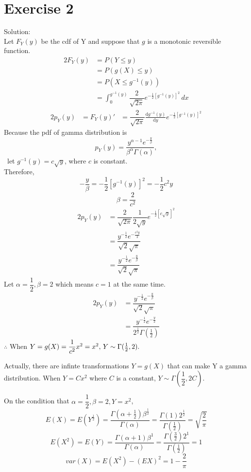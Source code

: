 \documentclass[a4papers]{ctexart}
\begin{document}
\section*{Exercise 2}
\noindent Solution:\\
\indent Let $F_Y(y)$ be the cdf of Y and suppose that $g$ is a monotonic reversible function.
\begin{alignat*}{2}
   F_Y(y) &= P(Y \le y)\\
          &= P(g(X) \le y)\\
          &= P(X \le g^{-1}(y))\\
          &= \int_{0}^{g^{-1}(y)}\dfrac{2}{\sqrt{2\pi}}e^{-\frac{1}{2}[g^{-1}(y)]^2}\,dx
\end{alignat*}
\begin{alignat*}{2}
    p_Y(y) &= F_Y(y)'
           &= \dfrac{2}{\sqrt{2\pi}}\frac{\mathrm{d}g^{-1}(y)}{\mathrm{d}y}e^{-\frac{1}{2}[g^{-1}(y)]^2}
\end{alignat*}
Because the pdf of gamma distribution is \[ p_Y(y) = \dfrac{y^{\alpha-1}e^{-\frac{y}{\beta}}}{\beta^\alpha\Gamma(\alpha)}, \]\,
let $g^{-1}(y)=c\sqrt{y}$,  where $c$ is constant.\\
Therefore, \[ -\dfrac{y}{\beta} = -\frac{1}{2}[g^{-1}(y)]^2 = -\frac{1}{2}c^2y \]
\[ \beta = \dfrac{2}{c^2} \]
\begin{alignat*}{2}
     p_Y(y)&=\dfrac{2}{\sqrt{2\pi}}\dfrac{1}{2\sqrt{y}}e^{-\frac{1}{2}[c\sqrt{y}]^2}\\
           &=\dfrac{y^{-\frac{1}{2}} e^{-\frac{c^2y}{2}}}{\sqrt{2}\sqrt{\pi}}\\
           &=\dfrac{y^{-\frac{1}{2}} e^{-\frac{y}{\beta}}}{\sqrt{2}\sqrt{\pi}}
\end{alignat*}
Let $\alpha = \dfrac{1}{2},\beta = 2$ which means $c = 1$ at the same time.\\
\begin{alignat*}{2}
     p_Y(y)&=\dfrac{y^{-\frac{1}{2}} e^{-\frac{y}{\beta}}}{\sqrt{2}\sqrt{\pi}}\\
           &=\dfrac{y^{-\frac{1}{2}} e^{-\frac{y}{2}}}{2^{\frac{1}{2}}\Gamma({\frac{1}{2}})}
\end{alignat*}
$\therefore$ When $Y=g(X)=\dfrac{1}{c^2}x^2=x^2,\, Y \sim \Gamma(\frac{1}{2},2).\\$

Actually, there are infinte transformations $Y=g(X)$ that can make Y a gamma distribution. 
When $Y=Cx^2$ where $C$ is a constant, $Y \sim \Gamma(\dfrac{1}{2},2C)$.

On the condition that $\alpha=\dfrac{1}{2},\beta=2,Y=x^2$,
\[
    E(X)=E(Y^{\frac{1}{2}})
    =\dfrac{ \Gamma(\alpha+\frac{1}{2}) \beta^{\frac{1}{2}} }{\Gamma(\alpha)} 
    =\dfrac{ \Gamma(1) 2^{\frac{1}{2}} }{\Gamma(\frac{1}{2})}=\sqrt{\dfrac{2}{\pi}}    
\]
\[
    E(X^2)=E(Y)
    =\dfrac{ \Gamma(\alpha+1) \beta^1 }{\Gamma(\alpha)} 
    =\dfrac{ \Gamma(\frac{3}{2}) 2^{1} }{\Gamma(\frac{1}{2})}
    =1
\]
\[
    var(X)=E(X^2)-(EX)^2=1-\dfrac{2}{\pi}
\]
\end{document}
